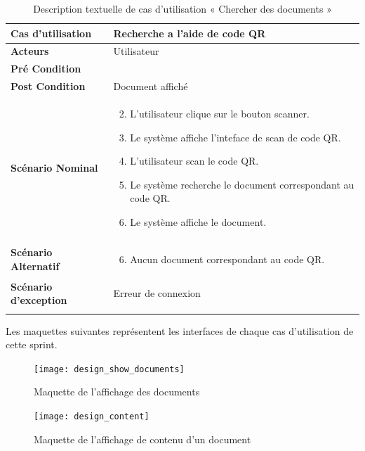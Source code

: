 \begin{longtable}{|p{5cm}|p{10cm}|}
\hline
\textbf{Cas d'utilisation}&Recherche a l'aide de code QR\\
\hline
\textbf{Acteurs}&Utilisateur\\
\hline
\textbf{Pré Condition}&\\
\hline
\textbf{Post Condition}&Document affiché\\
\hline
\textbf{Scénario Nominal}&
\vspace{-\baselineskip}
\begin{enumerate}
    \setcounter{enumi}{1}
    \item L'utilisateur clique sur le bouton scanner.
    \item Le système affiche l'inteface de scan de code QR.
    \item L'utilisateur scan le code QR.
    \item Le système recherche le document correspondant au code QR.
    \item Le système affiche le document.
\end{enumerate}\\
\hline
\textbf{Scénario Alternatif}&
\vspace{-\baselineskip}
\begin{enumerate}
    \setcounter{enumi}{5}
    \item Aucun document correspondant au code QR.
\end{enumerate}\\
\hline
\textbf{Scénario d'exception}&Erreur de connexion\\
\hline
\caption{Description textuelle de cas d'utilisation « Chercher des documents »}
\label{tab:DescriptionTextuelleDeCasDUtilisationChercherDesDocumentsQR}
\end{longtable}


Les maquettes suivantes représentent les interfaces de chaque cas d'utilisation de cette sprint. \\

\begin{figure}[H]
  \centering
  \texttt{[image: design\_show\_documents]}
  \caption{Maquette de l'affichage des documents}
  \label{fig:design_show_documents}
\end{figure}

\begin{figure}[H]
  \centering
  \texttt{[image: design\_content]}
  \caption{Maquette de l'affichage de contenu d'un document}
  \label{fig:design_show_document}
\end{figure}

